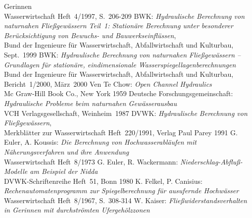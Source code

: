 \begin{thebibliography}{99}
{                                 Gerinnen}
                                 \\ Wasserwirtschaft Heft~4/1997, S.~206-209
                BWK: \emph{Hydraulische Berechnung von naturnahen Flie{\ss}gew\"{a}ssern Teil~1: Station\"{a}re
                                 Berechnung unter besonderer Ber\"{u}cksichtigung von Bewuchs- und Bauwerkseinfl\"{u}ssen},
                                 \\ Bund der Ingenieure f\"{u}r Wasserwirtschaft, Abfallwirtschaft und Kulturbau, Sept.~1999
                BWK: \emph{Hydraulische Berechnung von naturnahen Flie{\ss}gew\"{a}ssern -- Grundlagen f\"{u}r
                                 station\"{a}re, eindimensionale Wasserspiegellagenberechnungen}
                                 \\ Bund der Ingenieure f\"{u}r Wasserwirtschaft, Abfallwirtschaft und Kulturbau, Bericht~1/2000,
                                 M\"{a}rz~2000
                   Ven Te Chow: \emph{Open Channel Hydraulics}
                                 \\ Mc Graw-Hill Book Co., New York 1959
        Deutsche Forschungsgemeinschaft: \emph{Hydraulische Probleme beim naturnahen Gew\"{a}sserausbau}
                                 \\ VCH Verlagsgesellschaft, Weinheim~1987
               DVWK: \emph{Hydraulische Berechnung von Flie{\ss}gew\"{a}ssern},
                                 \\ Merkbl\"{a}tter zur Wasserwirtschaft Heft~220/1991, Verlag Paul Parey 1991
           G. Euler, A. Koussis: \emph{Die Berechnung von Hochwasserabl\"{a}ufen mit N\"{a}herungsverfahren
                                 und ihre Anwendung}
                                 \\ Wasserwirtschaft Heft~8/1973
        G. Euler, R. Wackermann: \emph{Niederschlag-Abflu{\ss}-Modelle am Beispiel der Nidda}
                                 \\ DVWK-Schriftenreihe Heft~51, Bonn 1980
         K. Felkel, P. Canisius: \emph{Rechenautomatenprogramm zur Spiegelberechnung f\"{u}r ausufernde
                                 Hochw\"{a}sser}
                                 \\ Wasserwirtschaft Heft~8/1967, S.~308-314
                 W. Kaiser: \emph{Flie{\ss}widerstandsverhalten in Gerinnen mit durchstr\"{o}mten Ufergeh\"{o}lzzonen}

\end{thebibliography}
